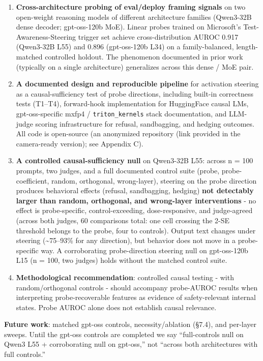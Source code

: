 \documentclass[
]{article}
\providecommand{\tightlist}{%
  \setlength{\itemsep}{0pt}\setlength{\parskip}{0pt}}
\begin{document}
\begin{enumerate}
\def\labelenumi{\arabic{enumi}.}
\tightlist
\item
  \textbf{Cross-architecture probing of eval/deploy framing signals} on
  two open-weight reasoning models of different architecture families
  (Qwen3-32B dense decoder; gpt-oss-120b MoE). Linear probes trained on
  Microsoft's Test-Awareness-Steering trigger set achieve
  cross-distribution AUROC 0.917 (Qwen3-32B L55) and 0.896 (gpt-oss-120b
  L34) on a family-balanced, length-matched controlled holdout. The
  phenomenon documented in prior work (typically on a single
  architecture) generalizes across this dense / MoE pair.
\item
  \textbf{A documented design and reproducible pipeline} for activation
  steering as a causal-sufficiency test of probe directions, including
  built-in correctness tests (T1--T4), forward-hook implementation for
  HuggingFace causal LMs, gpt-oss-specific mxfp4 /
  \texttt{triton\_kernels} stack documentation, and LLM-judge scoring
  infrastructure for refusal, sandbagging, and hedging outcomes. All
  code is open-source (an anonymized repository (link provided in the
  camera-ready version); see Appendix C).
\item
  \textbf{A controlled causal-sufficiency null} on Qwen3-32B L55: across
  n = 100 prompts, two judges, and a full documented control suite
  (probe, probe-coefficient, random, orthogonal, wrong-layer), steering
  on the probe direction produces behavioral effects (refusal,
  sandbagging, hedging) \textbf{not detectably larger than random,
  orthogonal, and wrong-layer interventions} - no effect is
  probe-specific, control-exceeding, dose-responsive, and judge-agreed
  (across both judges, 60 comparisons total: one cell crossing the 2-SE
  threshold belongs to the probe, four to controls). Output text changes
  under steering (\textasciitilde75--93\% for any direction), but
  behavior does not move in a probe-specific way. A corroborating
  probe-direction steering null on gpt-oss-120b L15 (n = 100, two
  judges) holds without the matched control suite.
\item
  \textbf{Methodological recommendation}: controlled causal testing -
  with random/orthogonal controls - should accompany probe-AUROC results
  when interpreting probe-recoverable features as evidence of
  safety-relevant internal states. Probe AUROC alone does not establish
  causal relevance.
\end{enumerate}

\textbf{Future work}: matched gpt-oss controls, necessity/ablation
(§7.4), and per-layer sweeps. Until the gpt-oss controls are completed
we say ``full-controls null on Qwen3 L55 + corroborating null on
gpt-oss,'' not ``across both architectures with full controls.''
\end{document}
